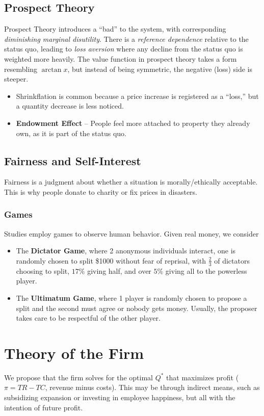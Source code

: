 \documentclass{article}
\begin{document}
\subsection{Prospect Theory}
Prospect Theory introduces a ``bad'' to the system, with corresponding \textit{diminishing marginal disutility}. There is a \textit{reference dependence} relative to the status quo, leading to \textit{loss aversion} where any decline from the status quo is weighted more heavily.
The value function in prospect theory takes a form resembling $\arctan{x}$, but instead of being symmetric, the negative (loss) side is steeper.
\begin{itemize}
	\item Shrinkflation is common because a price increase is registered as a ``loss,'' but a quantity decrease is less noticed.
	\item \textbf{Endowment Effect} -- People feel more attached to property they already own, as it is part of the status quo.
\end{itemize}

\subsection{Fairness and Self-Interest}
Fairness is a judgment about whether a situation is morally/ethically acceptable. This is why people donate to charity or fix prices in disasters.

\subsubsection{Games}
Studies employ games to observe human behavior. Given real money, we consider
\begin{itemize}
	\item The \textbf{Dictator Game}, where 2 anonymous individuals interact, one is randomly chosen to split \$1000 without fear of reprisal, with $\frac{2}{3}$ of  dictators choosing to split, $17\%$ giving half, and over $5\%$ giving all to the powerless player.
	\item The \textbf{Ultimatum Game}, where 1 player is randomly chosen to propose a split and the second must agree or nobody gets money. Usually, the proposer takes care to be respectful of the other player.
\end{itemize}
\section{Theory of the Firm}
We propose that the firm solves for the optimal $Q^*$ that maximizes profit ($\pi = TR-TC$, revenue minus costs). This may be through indirect means, such as subsidizing expansion or investing in employee happiness, but all with the intention of future profit.
\end{document}
